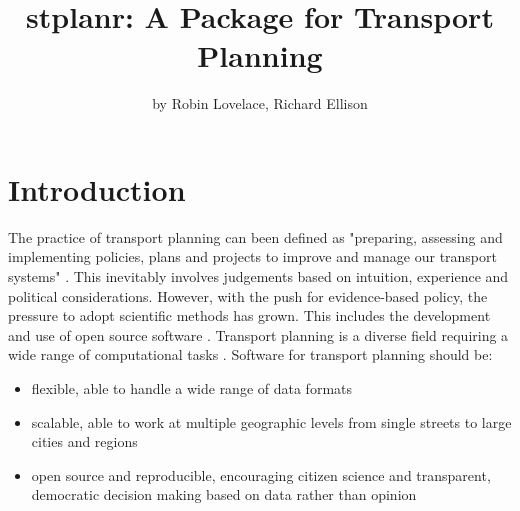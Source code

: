 \title{stplanr: A Package for Transport Planning}
\author{by Robin Lovelace, Richard Ellison}

\maketitle


\section{Introduction}\label{introduction}

The practice of transport planning can been defined as
"preparing, assessing and implementing policies, plans and projects to
improve and manage our transport systems"
\citep{jones_road_2014}.
This inevitably involves judgements based on intuition, experience and political considerations.
However, with the push for evidence-based policy, the pressure to adopt scientific methods has grown.
This includes the development and use of open source software \citep{balmer_matsim-t:_2009}.
Transport planning is a diverse field requiring a wide range of computational tasks \citep{boyce_forecasting_2015}.
Software for transport planning should be:

\begin{itemize}
\tightlist
\item
  flexible, able to handle a wide range of data formats
\item
  scalable, able to work at multiple geographic levels from single streets to large cities and regions
\item
  open source and reproducible, encouraging citizen science and transparent, democratic decision making based on data rather than opinion
\end{itemize}

